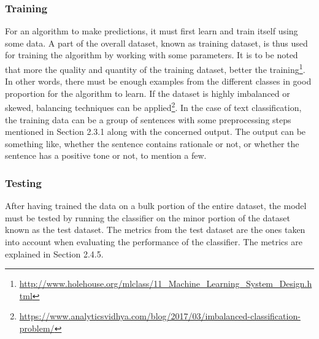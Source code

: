 \documentclass[a4paper,12pt,twoside]{report}
\begin{document}
\subsubsection{Training} 
For an algorithm to make predictions, it must first learn and train itself using some data. A part of the overall dataset, known as training dataset, is thus used for training the algorithm by working with some parameters. It is to be noted that more the quality and quantity of the training dataset, better the training\footnote{\url{http://www.holehouse.org/mlclass/11_Machine_Learning_System_Design.html}}. In other words, there must be enough examples from the different classes in good proportion for the algorithm to learn.  If the dataset is highly imbalanced or skewed, balancing techniques can be applied\footnote{\url{https://www.analyticsvidhya.com/blog/2017/03/imbalanced-classification-problem/}}. In the case of text classification, the training data can be a group of sentences with some preprocessing steps mentioned in Section 2.3.1 along with the concerned output. The output can be something like, whether the sentence contains rationale or not, or whether the sentence has a positive tone or not, to mention a few.

\subsubsection{Testing} 
After having trained the data on a bulk portion of the entire dataset, the model must be tested by running the classifier on the minor portion of the dataset known as the test dataset. The metrics from the test dataset are the ones taken into account when evaluating the performance of the classifier. The metrics are explained in Section 2.4.5. 
\end{document}
